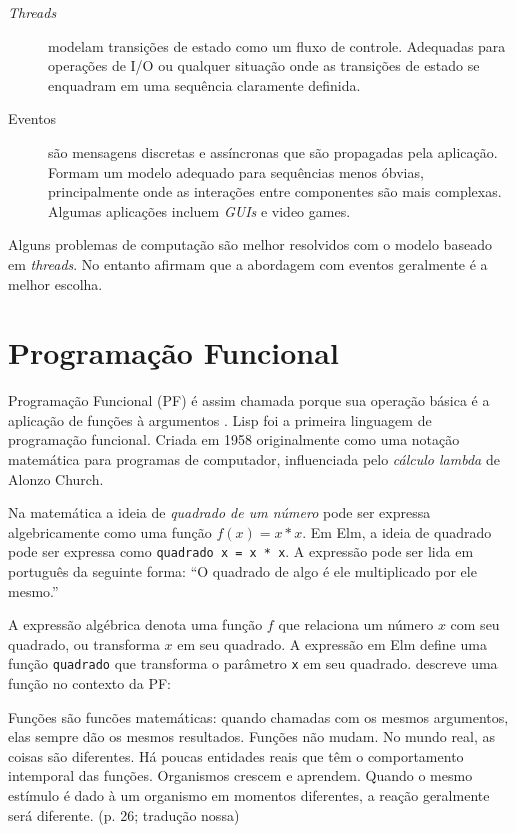 \begin{description}
\item[{\emph{Threads}}] modelam transições de estado como um fluxo de controle.
Adequadas para operações de I/O ou qualquer situação onde as
transições de estado se enquadram em uma sequência claramente
definida.
\item[{Eventos}] são mensagens discretas e assíncronas que são propagadas pela
aplicação. Formam um modelo adequado para sequências menos
óbvias, principalmente onde as interações entre componentes são
mais complexas. Algumas aplicações incluem \emph{GUIs} e video
games.
\end{description}

Alguns problemas de computação são melhor resolvidos com o modelo baseado
em \emph{threads}. No entanto \textcite{blackheath2016} afirmam que a
abordagem com eventos geralmente é a melhor escolha.

\section{Programação Funcional}
\label{sec:org266d840}
Programação Funcional (PF) é assim chamada porque sua operação básica é a
aplicação de funções à argumentos \cite{hughes1990}.
Lisp foi a primeira linguagem de programação funcional.
Criada em 1958 originalmente como uma notação matemática para programas de
computador, influenciada pelo \emph{cálculo lambda} de Alonzo Church.

Na matemática a ideia de \emph{quadrado de um número} pode ser expressa
algebricamente como uma função \(f(x)=x*x\).
Em Elm,  a ideia de quadrado pode ser
expressa como \texttt{quadrado x = x * x}.
A expressão pode ser lida em português da seguinte forma: “O quadrado de algo
é ele multiplicado por ele mesmo.”

A expressão algébrica denota uma função \(f\) que relaciona um número \(x\) com
seu quadrado, ou transforma \(x\) em seu quadrado.
A expressão em Elm define uma função \texttt{quadrado} que transforma o
parâmetro \texttt{x} em seu quadrado.
\textcite{roy2009} descreve uma função no contexto da PF:

\begin{citacao}
  Funções são funcões matemáticas: quando chamadas com os mesmos argumentos,
  elas sempre dão os mesmos resultados. Funções não mudam. No mundo real,
  as coisas são diferentes. Há poucas entidades reais que têm o comportamento
  intemporal das funções. Organismos crescem e aprendem. Quando o mesmo
  estímulo é dado à um organismo em momentos diferentes, a reação geralmente
  será diferente. (p. 26; tradução nossa)
\end{citacao}

